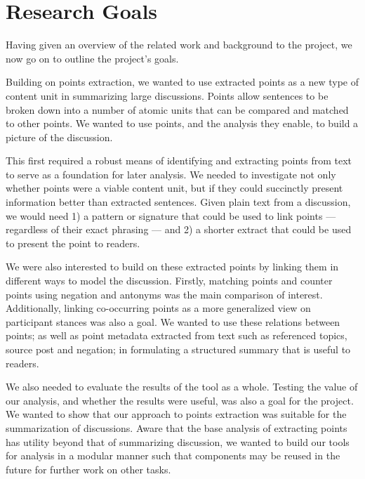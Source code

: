 \chapter{Research Goals\label{chap:res-goals}}
  Having given an overview of the related work and background to the project, we now go on to outline the project's goals.

  Building on points extraction, we wanted to use extracted points as a new type of content unit in summarizing large discussions. Points allow sentences to be broken down into a number of atomic units that can be compared and matched to other points. We wanted to use points, and the analysis they enable, to build a picture of the discussion.

  This first required a robust means of identifying and extracting points from text to serve as a foundation for later analysis. We needed to investigate not only whether points were a viable content unit, but if they could succinctly present information better than extracted sentences. Given plain text from a discussion, we would need 1) a pattern or signature that could be used to link points --- regardless of their exact phrasing --- and 2) a shorter extract that could be used to present the point to readers.

  We were also interested to build on these extracted points by linking them in different ways to model the discussion. Firstly, matching points and counter points using negation and antonyms was the main comparison of interest. Additionally, linking co-occurring points as a more generalized view on participant stances was also a goal. We wanted to use these relations between points; as well as point metadata extracted from text such as referenced topics, source post and negation; in formulating a structured summary that is useful to readers.

  We also needed to evaluate the results of the tool as a whole. Testing the value of our analysis, and whether the results were useful, was also a goal for the project. We wanted to show that our approach to points extraction was suitable for the summarization of discussions. Aware that the base analysis of extracting points has utility beyond that of summarizing discussion, we wanted to build our tools for analysis in a modular manner such that components may be reused in the future for further work on other tasks.
